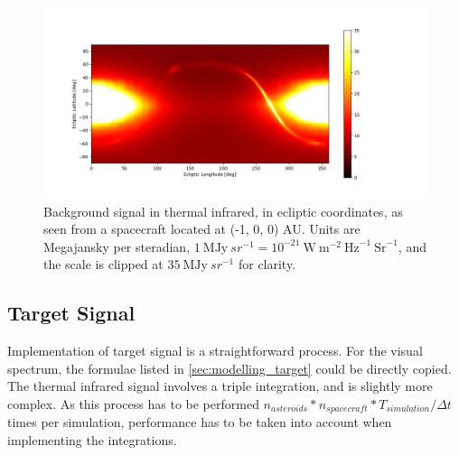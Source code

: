 \begin{figure}[htbp]
 \centering
 \includegraphics[width=1.0\textwidth]{img/background_tir_combined.png}
 \caption{Background signal in thermal infrared, in ecliptic coordinates, as seen from a spacecraft located at (-1, 0, 0) AU. Units are Megajansky per steradian, $1 ~\mathrm{MJy}~{sr}^{-1} = 10^{-21} ~\mathrm{W}~\mathrm{m}^{-2}~\mathrm{Hz}^{-1}~\mathrm{Sr}^{-1}$, and the scale is clipped at $35 ~\mathrm{MJy}~{sr}^{-1}$ for clarity.}
 \label{fig:combinedtirbackground}
\end{figure}

\subsection{Target Signal}
Implementation of target signal is a straightforward process. For the visual spectrum, the formulae listed in \autoref{sec:modelling_target} could be directly copied. The thermal infrared signal involves a triple integration, and is slightly more complex. As this process has to be performed $n_{asteroids} * n_{spacecraft} * T_{simulation} / \Delta t$ times per simulation, performance has to be taken into account when implementing the integrations. \\

